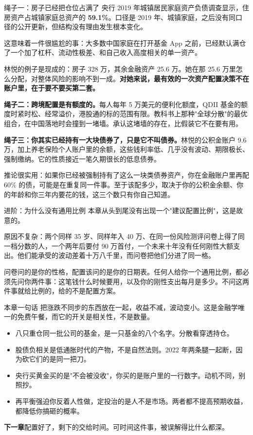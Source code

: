 \begin{egbox}{绳子一：房子已经把仓位占满了}
央行 2019 年城镇居民家庭资产负债调查显示，住房资产占城镇家庭总资产的 \textbf{59.1\%}。口径是 2019 年、城镇家庭，之后没有同口径的公开更新，但结构没有理由发生根本变化。

这意味着一件很尴尬的事：大多数中国家庭在打开基金 App 之前，已经默认满仓了一个加了杠杆、流动性极差、和自己收入高度相关的单一资产。

林悦的例子是现成的：房子 328 万，其余金融资产 25.6 万。她在那 25.6 万里怎么分配，对整体风险的影响不到一成。\textbf{对她来说，最有效的一次资产配置决策不在账户里，在于要不要买第二套。}

\end{egbox}

\textbf{绳子二：跨境配置是有额度的。}每人每年 5 万美元的便利化额度，QDII 基金的额度时紧时松、经常溢价，港股通的标的范围有限。教科书上那种"全球分散"的最优组合，在中国落地时会撞到一堵墙。承认这堵墙的存在，比假装它不在要有用。

\textbf{绳子三：你其实已经持有一大块债券了，只是它不叫债券。}林悦的公积金账户 9.6 万，加上养老保险个人账户里的余额，这些钱利率低、几乎没有波动、期限极长、强制缴纳。它的性质接近一笔久期很长的低息债券。

推论很实用：如果你已经被强制持有了这么一块类债券资产，你在金融账户里再配 60\% 的债，可能是在重复同一件事。至于该配多少，取决于你的公积金余额、你的年龄和你三年内要花的钱，这三个数只有你自己知道。

\begin{deepbox}{进阶：为什么没有通用比例}
本章从头到尾没有出现一个"建议配置比例"，这是故意的。

原因不复杂：两个同样 35 岁、同样年入 40 万、在同一份风险测评问卷上得了同一档分数的人，一个两年后要付 90 万首付，一个未来十年没有任何刚性大额支出。他们能承受的波动差着十万八千里，而问卷把他们分进了同一格。

问卷问的是你的性格，配置该问的是你的日期表。任何人给你一个通用比例，都必须先问你两件事：这笔钱什么时候要用，以及你的刚性支出每月是多少。不问这两件事就给比例的，给的不是配置方案。

\end{deepbox}

\begin{takeaway}{本章一句话}
把涨跌不同步的东西放在一起，收益不减，波动变小。这是金融学唯一的免费午餐，而它的开关是相关性，不是数量。

\begin{itemize}
  \item 八只重仓同一批公司的基金，是一只基金的八个名字。分散看穿透持仓。
  \item 股债负相关是低通胀时代的产物，不是自然法则。2022 年两条腿一起断，因为砍它们的是同一把刀。
  \item 央行买黄金买的是"不会被没收"，你买的是账户里的一行数字。动机不同，别照抄。
  \item 再平衡强迫你反着人性做，定投治的是人不是市场。两者都不提高预期收益，都降低你搞砸的概率。
\end{itemize}

\end{takeaway}

\begin{bridgebox}
\textbf{下一章}配置好了，剩下的交给时间。可时间这件事，被误解得比什么都深。
\end{bridgebox}

